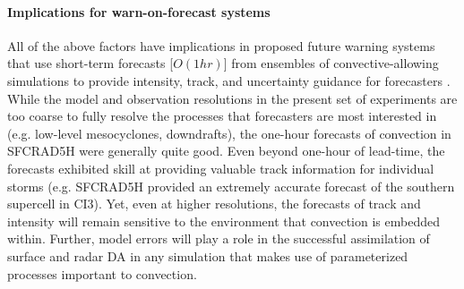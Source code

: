 \paragraph{Implications for warn-on-forecast systems}
All of the above factors have implications in proposed future warning systems that use short-term forecasts [\(O(1hr)\)] from ensembles of convective-allowing simulations to provide intensity, track, and uncertainty guidance for forecasters \citep{stensrudetal09a,stensrudetal13}. While the model and observation resolutions in the present set of experiments are too coarse to fully resolve the processes that forecasters are most interested in (e.g. low-level mesocyclones, downdrafts), the one-hour forecasts of convection in SFCRAD5H were generally quite good. Even beyond one-hour of lead-time, the forecasts exhibited skill at providing valuable track information for individual storms (e.g. SFCRAD5H provided an extremely accurate forecast of the southern supercell in CI3).  Yet, even at higher resolutions, the forecasts of track and intensity will remain sensitive to the environment that convection is embedded within. Further, model errors will play a role in the successful assimilation of surface and radar DA in any simulation that makes use of parameterized processes important to convection.